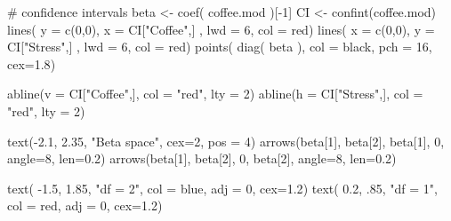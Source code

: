 \documentclass[
  letterpaper,
  10pt,
  krantz2]{krantz}
\makeatletter
\newenvironment{Shaded}{\begin{snugshade}}{\end{snugshade}}
\newcommand{\AttributeTok}[1]{\textcolor[rgb]{0.40,0.45,0.13}{#1}}
\newcommand{\CommentTok}[1]{\textcolor[rgb]{0.37,0.37,0.37}{#1}}
\newcommand{\DecValTok}[1]{\textcolor[rgb]{0.68,0.00,0.00}{#1}}
\newcommand{\FloatTok}[1]{\textcolor[rgb]{0.68,0.00,0.00}{#1}}
\newcommand{\FunctionTok}[1]{\textcolor[rgb]{0.28,0.35,0.67}{#1}}
\newcommand{\NormalTok}[1]{\textcolor[rgb]{0.00,0.23,0.31}{#1}}
\newcommand{\OtherTok}[1]{\textcolor[rgb]{0.00,0.23,0.31}{#1}}
\newcommand{\SpecialCharTok}[1]{\textcolor[rgb]{0.37,0.37,0.37}{#1}}
\newcommand{\StringTok}[1]{\textcolor[rgb]{0.13,0.47,0.30}{#1}}
\newenvironment{kframe}{%
  \medskip{}
  \setlength{\fboxsep}{.8em}
  \def\at@end@of@kframe{}%
  \ifinner\ifhmode%
  \def\at@end@of@kframe{\end{minipage}}%
  \begin{minipage}{\columnwidth}%
  \fi\fi%
  \def\FrameCommand##1{\hskip\@totalleftmargin \hskip-\fboxsep
  \colorbox{shadecolor}{##1}\hskip-\fboxsep
      \hskip-\linewidth \hskip-\@totalleftmargin \hskip\columnwidth}%
  \MakeFramed {\advance\hsize-\width
    \@totalleftmargin\z@ \linewidth\hsize
    \@setminipage}}%
{\par\unskip\endMakeFramed%
  \at@end@of@kframe}
\renewenvironment{Shaded}{\begin{kframe}}{\end{kframe}}
\makeatother
\begin{document}
{\begin{Shaded}
\begin{Highlighting}[]
\CommentTok{\# confidence intervals}
\NormalTok{beta }\OtherTok{\textless{}{-}} \FunctionTok{coef}\NormalTok{( coffee.mod )[}\SpecialCharTok{{-}}\DecValTok{1}\NormalTok{]}
\NormalTok{CI }\OtherTok{\textless{}{-}} \FunctionTok{confint}\NormalTok{(coffee.mod)}
\FunctionTok{lines}\NormalTok{( }\AttributeTok{y =} \FunctionTok{c}\NormalTok{(}\DecValTok{0}\NormalTok{,}\DecValTok{0}\NormalTok{), }\AttributeTok{x =}\NormalTok{ CI[}\StringTok{"Coffee"}\NormalTok{,] , }\AttributeTok{lwd =} \DecValTok{6}\NormalTok{, }\AttributeTok{col =} \StringTok{\textquotesingle{}red\textquotesingle{}}\NormalTok{)}
\FunctionTok{lines}\NormalTok{( }\AttributeTok{x =} \FunctionTok{c}\NormalTok{(}\DecValTok{0}\NormalTok{,}\DecValTok{0}\NormalTok{), }\AttributeTok{y =}\NormalTok{ CI[}\StringTok{"Stress"}\NormalTok{,] , }\AttributeTok{lwd =} \DecValTok{6}\NormalTok{, }\AttributeTok{col =} \StringTok{\textquotesingle{}red\textquotesingle{}}\NormalTok{)}
\FunctionTok{points}\NormalTok{( }\FunctionTok{diag}\NormalTok{( beta ), }\AttributeTok{col =} \StringTok{\textquotesingle{}black\textquotesingle{}}\NormalTok{, }\AttributeTok{pch =} \DecValTok{16}\NormalTok{, }\AttributeTok{cex=}\FloatTok{1.8}\NormalTok{)}

\FunctionTok{abline}\NormalTok{(}\AttributeTok{v =}\NormalTok{ CI[}\StringTok{"Coffee"}\NormalTok{,], }\AttributeTok{col =} \StringTok{"red"}\NormalTok{, }\AttributeTok{lty =} \DecValTok{2}\NormalTok{)}
\FunctionTok{abline}\NormalTok{(}\AttributeTok{h =}\NormalTok{ CI[}\StringTok{"Stress"}\NormalTok{,], }\AttributeTok{col =} \StringTok{"red"}\NormalTok{, }\AttributeTok{lty =} \DecValTok{2}\NormalTok{)}

\FunctionTok{text}\NormalTok{(}\SpecialCharTok{{-}}\FloatTok{2.1}\NormalTok{, }\FloatTok{2.35}\NormalTok{, }\StringTok{"Beta space"}\NormalTok{, }\AttributeTok{cex=}\DecValTok{2}\NormalTok{, }\AttributeTok{pos =} \DecValTok{4}\NormalTok{)}
\FunctionTok{arrows}\NormalTok{(beta[}\DecValTok{1}\NormalTok{], beta[}\DecValTok{2}\NormalTok{], beta[}\DecValTok{1}\NormalTok{], }\DecValTok{0}\NormalTok{, }\AttributeTok{angle=}\DecValTok{8}\NormalTok{, }\AttributeTok{len=}\FloatTok{0.2}\NormalTok{)}
\FunctionTok{arrows}\NormalTok{(beta[}\DecValTok{1}\NormalTok{], beta[}\DecValTok{2}\NormalTok{], }\DecValTok{0}\NormalTok{, beta[}\DecValTok{2}\NormalTok{], }\AttributeTok{angle=}\DecValTok{8}\NormalTok{, }\AttributeTok{len=}\FloatTok{0.2}\NormalTok{)}

\FunctionTok{text}\NormalTok{( }\SpecialCharTok{{-}}\FloatTok{1.5}\NormalTok{, }\FloatTok{1.85}\NormalTok{, }\StringTok{"df = 2"}\NormalTok{, }\AttributeTok{col =} \StringTok{\textquotesingle{}blue\textquotesingle{}}\NormalTok{, }\AttributeTok{adj =} \DecValTok{0}\NormalTok{, }\AttributeTok{cex=}\FloatTok{1.2}\NormalTok{)}
\FunctionTok{text}\NormalTok{( }\FloatTok{0.2}\NormalTok{, .}\DecValTok{85}\NormalTok{, }\StringTok{"df = 1"}\NormalTok{, }\AttributeTok{col =} \StringTok{\textquotesingle{}red\textquotesingle{}}\NormalTok{, }\AttributeTok{adj =} \DecValTok{0}\NormalTok{, }\AttributeTok{cex=}\FloatTok{1.2}\NormalTok{)}


\end{Highlighting}
\end{Shaded}}
\end{document}
